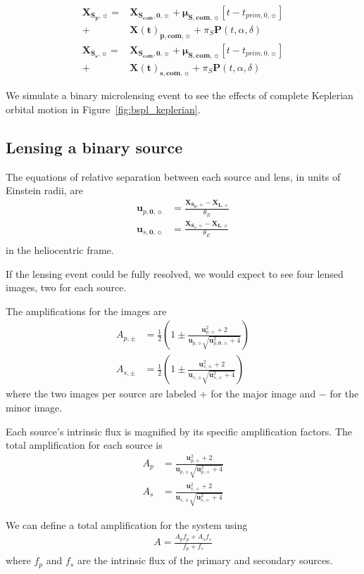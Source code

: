 \documentclass[twocolumn]{aastex701}
\newcommand{\vect}[1]{\boldsymbol{#1}}
\newcommand{\thetaE}{\theta_E}
\newcommand{\mussysvec}{\vect{\mu}_{\boldsymbol{S, com},\sun}}
\newcommand{\Xlvec}{\vect{X}_{\boldsymbol{L},\sun}}
\newcommand{\Xscomvec}{\vect{X}_{\boldsymbol{S_{com},0},\sun}}
\newcommand{\Xspvec}{\vect{X}_{\boldsymbol{S_p},\sun}}
\newcommand{\Xcomp}{\vect{X(t)}_{\boldsymbol{p},\boldsymbol{com},\sun}}
\newcommand{\Xcoms}{\vect{X(t)}_{\boldsymbol{s},\boldsymbol{com},\sun}}
\newcommand{\Xssvec}{\vect{X}_{\boldsymbol{S_s},\sun}}
\newcommand{\upvec}{\vect{u}_{p,\sun}}
\newcommand{\usvec}{\vect{u}_{s,\sun}}
\newcommand{\upveco}{\vect{u}_{p,\boldsymbol{0},\sun}}
\newcommand{\usveco}{\vect{u}_{s,\boldsymbol{0},\sun}}
\newcommand{\tpnot}{t_{prim,0,\sun}}
\begin{document}
\begin{align}
    \Xspvec =& \Xscomvec + \mussysvec  [t - \tpnot] \nonumber \\
    +& \Xcomp + \pi_S \vect{P}(t, \alpha, \delta) \\
    \Xssvec =& \Xscomvec + \mussysvec [t - \tpnot] \nonumber \\
    +& \Xcoms + \pi_S \vect{P}(t, \alpha, \delta) 
\end{align}

We simulate a binary microlensing event to see the effects of complete Keplerian orbital motion in Figure~\ref{fig:bspl_keplerian}. 

\subsection{Lensing a binary source}
\label{sec:binsources_eqn}

The equations of relative separation between each source and lens, in units of Einstein radii, are
\begin{eqnarray}
\upveco &= \frac{\Xspvec-\Xlvec}{\thetaE} \\
\usveco &= \frac{\Xssvec-\Xlvec}{\thetaE} \\
\end{eqnarray}
in the heliocentric frame.

If the lensing event could be fully resolved, we would expect to see four lensed images, two for each source. 

The amplifications for the images are
\begin{eqnarray}
A_{p,\pm} &= \frac{1}{2} \left( 1 \pm \frac{\upvec^2 + 2}{\upvec \sqrt{\upveco^2 + 4}} \right) \\
A_{s,\pm} &= \frac{1}{2} \left( 1 \pm \frac{\usvec^2 + 2}{\usvec \sqrt{\usvec^2 + 4}} \right) 
\end{eqnarray}
where the two images per source are labeled $+$ for the major image and $-$ for the minor image.


Each source's intrinsic flux is magnified by its specific amplification factors. The total amplification for each source is
\begin{eqnarray}
 A_p &= \frac{\upvec^2 + 2}{\upvec \sqrt{\upvec^2 + 4}} \\
 A_s &= \frac{\usvec^2 + 2}{\usvec \sqrt{\usvec^2 + 4}}
\end{eqnarray}

We can define a total amplification for the system using
\begin{eqnarray}
 A = \frac{A_p f_p + A_s f_s}{f_p + f_s}
\end{eqnarray}
where $f_p$ and $f_s$ are the intrinsic flux of the primary and secondary sources.
\end{document}

